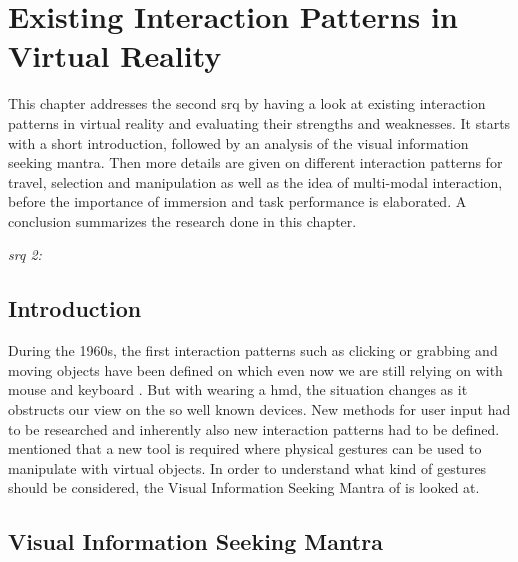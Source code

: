 
\section{Existing Interaction Patterns in Virtual Reality}

\label{SectionLiteratureReviewSRQ2}

This chapter addresses the second \gls{srq} by having a look at existing interaction patterns in virtual reality and evaluating their strengths and weaknesses. It starts with a short introduction, followed by an analysis of the visual information seeking mantra. Then more details are given on different interaction patterns for travel, selection and manipulation as well as the idea of multi-modal interaction, before the importance of immersion and task performance is elaborated. A conclusion summarizes the research done in this chapter.
\begin{framed}
	\textit{\gls{srq} 2: \srqtwotext}
\end{framed}


\subsection{Introduction}

During the 1960s, the first interaction patterns such as clicking or grabbing and moving objects have been defined on which even now we are still relying on with mouse and keyboard \citep{Myers1998}. But with wearing a \gls{hmd}, the situation changes as it obstructs our view on the so well known devices. New methods for user input had to be researched and inherently also new interaction patterns had to be defined. \cite{Donalek2014} mentioned that a new tool is required where physical gestures can be used to manipulate with virtual objects. In order to understand what kind of gestures should be considered, the Visual Information Seeking Mantra of \cite{Shneiderman1996} is looked at.



\subsection{Visual Information Seeking Mantra}

